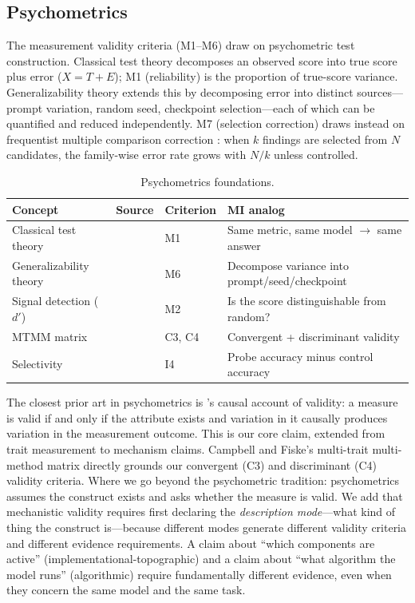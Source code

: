 \documentclass{article}
\begin{document}
\subsection{Psychometrics}
\label{sec:psychometrics}

The measurement validity criteria (M1--M6) draw on psychometric test construction. Classical test theory decomposes an observed score into true score plus error ($X = T + E$); M1 (reliability) is the proportion of true-score variance. Generalizability theory extends this by decomposing error into distinct sources---prompt variation, random seed, checkpoint selection---each of which can be quantified and reduced independently. M7 (selection correction) draws instead on frequentist multiple comparison correction \citep{benjamini1995controlling}: when $k$ findings are selected from $N$ candidates, the family-wise error rate grows with $N/k$ unless controlled.

\begin{table}[H]
\centering\small
\caption{Psychometrics foundations.}
\renewcommand{\arraystretch}{1.12}
\begin{tabular}{@{}l>{\raggedright\arraybackslash}p{2.2cm}l>{\raggedright\arraybackslash}p{4.5cm}@{}}
\toprule
\textbf{Concept} & \textbf{Source} & \textbf{Criterion} & \textbf{MI analog} \\
\midrule
Classical test theory & \citet{lord1968statistical} & M1 & Same metric, same model $\to$ same answer \\
\midrule
Generalizability theory & \citet{cronbach1972dependability} & M6 & Decompose variance into prompt/seed/checkpoint \\
\midrule
Signal detection ($d'$) & \citet{green1966signal} & M2 & Is the score distinguishable from random? \\
\midrule
MTMM matrix & \citet{campbell1959convergent} & C3, C4 & Convergent + discriminant validity \\
\midrule
Selectivity & \citet{hewitt2019designing} & I4 & Probe accuracy minus control accuracy \\
\bottomrule
\end{tabular}
\end{table}

The closest prior art in psychometrics is \citet{borsboom2004concept}'s causal account of validity: a measure is valid if and only if the attribute exists and variation in it causally produces variation in the measurement outcome. This is our core claim, extended from trait measurement to mechanism claims. Campbell and Fiske's \citep{campbell1959convergent} multi-trait multi-method matrix directly grounds our convergent (C3) and discriminant (C4) validity criteria. Where we go beyond the psychometric tradition: psychometrics assumes the construct exists and asks whether the measure is valid. We add that mechanistic validity requires first declaring the \emph{description mode}---what kind of thing the construct is---because different modes generate different validity criteria and different evidence requirements. A claim about ``which components are active'' (implementational-topographic) and a claim about ``what algorithm the model runs'' (algorithmic) require fundamentally different evidence, even when they concern the same model and the same task.
\end{document}
